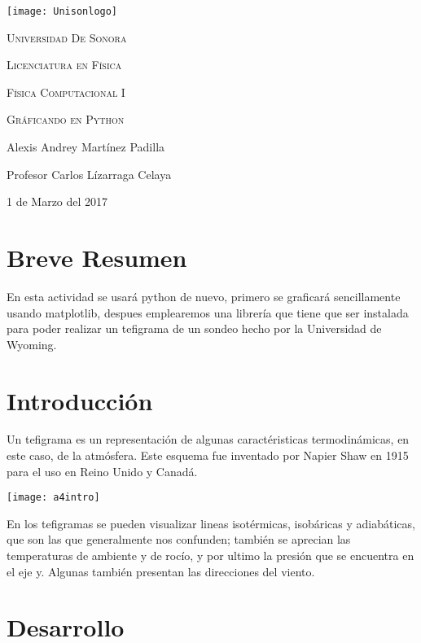\documentclass[12pt,a4paper]{article}
\begin{document}
\begin{titlepage}
	\centering
	\texttt{[image: Unisonlogo]}\par
    \vspace{1.3cm}
	\scshape \LARGE Universidad De Sonora \par
	\vspace{1cm}
	\scshape \Large Licenciatura en Física\par
    \scshape \Large Física Computacional I \par
	\vspace{1.5cm}
	\huge \scshape Gráficando en Python\par
	\vspace{2cm}
	\Large Alexis Andrey Martínez Padilla\par
    \Large Profesor Carlos Lízarraga Celaya\par
    \vspace{2.5cm}
    \Large 1 de Marzo del 2017
\end{titlepage}

\section{Breve Resumen}
En esta actividad se usará python de nuevo, primero se graficará sencillamente usando matplotlib, despues emplearemos una librería que tiene que ser instalada para poder realizar un tefigrama de un sondeo hecho por la Universidad de Wyoming.

\section{Introducción}
Un tefigrama es un representación de algunas caractéristicas termodinámicas, en este caso, de la atmósfera. Este esquema fue inventado por Napier Shaw en 1915 para el uso en Reino Unido y Canadá.

\begin{center}
\texttt{[image: a4intro]}
\end{center}

En los tefigramas se pueden visualizar lineas isotérmicas, isobáricas y adiabáticas, que son las que generalmente nos confunden; también se aprecian las temperaturas de ambiente y de rocío, y por ultimo la presión que se encuentra en el eje y. Algunas también presentan las direcciones del viento.

\newpage

\section{Desarrollo}
\end{document}
